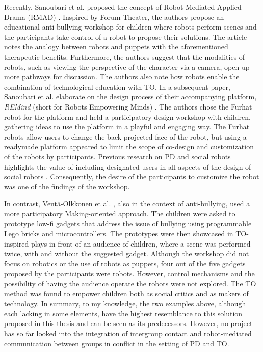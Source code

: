 \documentclass[dissertation,math,vertlayout,pdfa,colorlinks]{aaltoseries}
\begin{document}
Recently, Sanoubari et al. proposed the concept of Robot-Mediated Applied Drama (RMAD) \cite{sanoubariUsingRobotMediatedApplied2023}. Inspired by Forum Theater, the authors propose an educational anti-bullying workshop for children where robots perform scenes and the participants take control of a robot to propose their solutions. The article notes the analogy between robots and puppets with the aforementioned therapeutic benefits. Furthermore, the authors suggest that the modalities of robots, such as viewing the perspective of the character via a camera, open up more pathways for discussion. The authors also note how robots enable the combination of technological education with TO. In a subsequent paper, Sanoubari et al. elaborate on the design process of their accompanying platform, \textit{REMind} (short for Robots Empowering Minds) \cite{sanoubariWhatMakesEducational2024}. The authors chose the Furhat robot\cite{almoubayedFurhatBackProjectedHumanLike2012} for the platform and held a participatory design workshop with children, gathering ideas to use the platform in a playful and engaging way. The Furhat robots allow users to change the back-projected face of the robot, but using a readymade platform appeared to limit the scope of co-design and customization of the robots by participants. Previous research on PD and social robots highlights the value of including designated users in all aspects of the design of social robots \cite{axelssonSocialRobotCoDesign2021}. Consequently, the desire of the participants to customize the robot was one of the findings of the workshop.

In contrast, Ventä-Olkkonen et al. \cite{venta-olkkonenAllWorldOur2022}, also in the context of anti-bullying, used a more participatory Making-oriented approach. The children were asked to prototype low-fi gadgets that address the issue of bullying using programmable Lego bricks and microcontrollers. The prototypes were then showcased in TO-inspired plays in front of an audience of children, where a scene was performed twice, with and without the suggested gadget. Although the workshop did not focus on robotics or the use of robots as puppets, four out of the five gadgets proposed by the participants were robots. However, control mechanisms and the possibility of having the audience operate the robots were not explored. The TO method was found to empower children both as social critics and as makers of technology. In summary, to my knowledge, the two examples above, although each lacking in some elements, have the highest resemblance to this solution proposed in this thesis and can be seen as its predecessors. However, no project has so far looked into the integration of intergroup contact and robot-mediated communication between groups in conflict in the setting of PD and TO.
\end{document}
